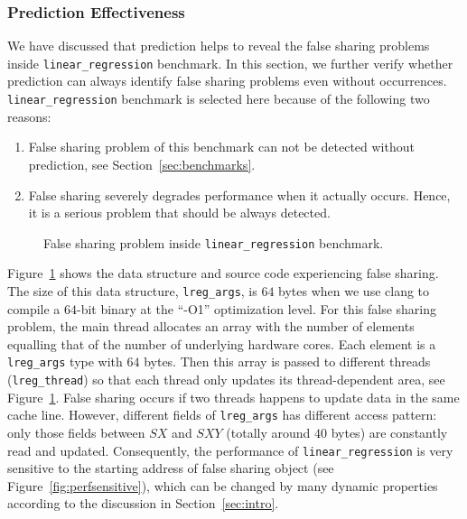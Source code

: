 \subsubsection{Prediction Effectiveness}
\label{sec:predicteval}
We have discussed that prediction helps to reveal the false sharing problems inside \texttt{linear\_regression} benchmark. In this section, we further verify whether prediction can always identify 
false sharing problems even without occurrences.
\texttt{linear\_regression} benchmark is selected here because of the following two reasons:
\begin{enumerate}
\item
False sharing problem of this benchmark can not be detected without prediction, see Section~\ref{sec:benchmarks}. 

\item
False sharing severely degrades performance when it actually occurs. 
Hence, it is a serious problem that should be always detected. 
\end{enumerate}

\begin{figure}[!h]
{\centering
\subfigure{}
\caption{False sharing problem inside \texttt{linear\_regression} benchmark.
\label{fig:linearregression}}
}
\end{figure}

Figure~\ref{fig:linearregression} shows the data structure and source code
experiencing false sharing.
The size of this data structure, \texttt{lreg\_args}, is $64$ bytes 
when we use clang to compile a $64$-bit binary at the ``-O1'' optimization level.
For this false sharing problem, the main thread allocates an array with the number of elements equalling
that of the number of underlying hardware cores.
Each element is a \texttt{lreg\_args} type with $64$ bytes. 
Then this array is passed to different threads (\texttt{lreg\_thread}) 
so that each thread only updates its thread-dependent area, see Figure~\ref{fig:linearregression}.
False sharing occurs if two threads happens to update data in the same cache line. 
However, different fields of \texttt{lreg\_args} has different access pattern:
only those fields between $SX$ and $SXY$ (totally around $40$ bytes) are constantly read and updated.
Consequently, the performance of \texttt{linear\_regression} is very sensitive to 
the starting address of false sharing object (see Figure~\ref{fig:perfsensitive}),
which can be changed by many dynamic properties according
to the discussion in Section~\ref{sec:intro}.

